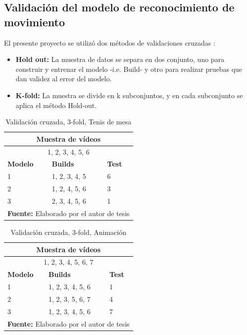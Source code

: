 \subsection{Validaci\'on del modelo de reconocimiento de movimiento}\label{dis:validate}
El presente proyecto se utiliz\'o dos m\'etodos de validaciones cruzadas \cite{perez2015analisis}:
\begin{itemize}
\item \textbf{Hold out:} La muestra de datos se separa en dos conjunto, uno para construir y entrenar el modelo -i.e. Build- y otro para realizar pruebas que dan validez al error del modelo.
\item \textbf{K-fold:} La muestra se divide en k subconjuntos, y en cada subconjunto se aplica el m\'etodo Hold-out.
\end{itemize}  
\begin{table}[H]
\begin{center}
\caption{Validaci\'on cruzada, 3-fold,  Tenis de mesa}
\label{tab:KfoldTenis}
\begin{tabular}{|l|l|l|}
\hline
\multicolumn{3}{|c|}{\textbf{Muestra de v\'ideos}} \\ \hline
\multicolumn{3}{|c|}{1, 2, 3, 4, 5, 6} \\ \hline
\textbf{Modelo} & \textbf{Builds} & \textbf{Test} \\ \hline
1 & 1, 2, 3, 4, 5 & 6 \\ \hline
2 & 1, 2, 4, 5, 6 & 3 \\ \hline
3 & 2, 3, 4, 5, 6 & 1 \\ \hline
\multicolumn{3}{l}{\textbf{Fuente:} Elaborado por el autor de tesis}
\end{tabular}
\end{center}
\end{table}
\begin{table}[H]
\begin{center}
\caption{Validaci\'on cruzada, 3-fold,  Animaci\'on}
\label{tab:KfoldAnimacion}
\begin{tabular}{|l|l|l|}
\hline
\multicolumn{3}{|c|}{\textbf{Muestra de v\'ideos}} \\ \hline
\multicolumn{3}{|c|}{1, 2, 3, 4, 5, 6, 7} \\ \hline
\textbf{Modelo} & \textbf{Builds} & \textbf{Test} \\ \hline
1 & 1, 2, 3, 4, 5, 6 & 1 \\ \hline
2 & 1, 2, 3, 5, 6, 7 & 4 \\ \hline
3 & 1, 2, 3, 4, 5, 6 & 7 \\ \hline
\multicolumn{3}{l}{\textbf{Fuente:} Elaborado por el autor de tesis}
\end{tabular}
\end{center}
\end{table}
